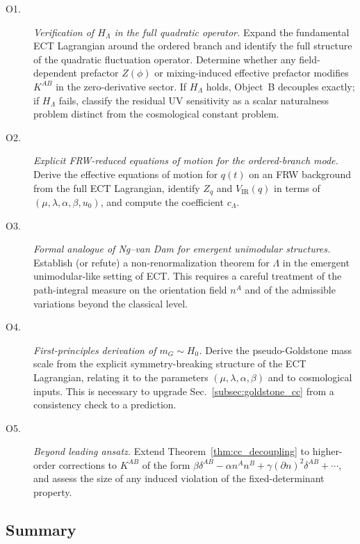 \begin{description}
\item[O1.] \textit{Verification of $H_\Lambda$ in the full quadratic operator.}
Expand the fundamental ECT Lagrangian around the ordered branch and
identify the full structure of the quadratic fluctuation operator.
Determine whether any field-dependent prefactor $Z(\phi)$ or
mixing-induced effective prefactor modifies $K^{AB}$ in the
zero-derivative sector. If $H_\Lambda$ holds, Object~B decouples exactly; if
$H_\Lambda$ fails, classify the residual UV sensitivity as a scalar
naturalness problem distinct from the cosmological constant problem.

\item[O2.] \textit{Explicit FRW-reduced equations of motion for the
ordered-branch mode.} Derive the effective equations of motion for
$q(t)$ on an FRW background from the full ECT Lagrangian, identify
$Z_q$ and $V_{\mathrm{IR}}(q)$ in terms of
$(\mu,\lambda,\alpha,\beta,u_0)$, and compute the coefficient
$c_\Lambda$.

\item[O3.] \textit{Formal analogue of Ng--van Dam for emergent
unimodular structures.} Establish (or refute) a non-renormalization
theorem for $\Lambda$ in the emergent unimodular-like setting of ECT.
This requires a careful treatment of the path-integral measure on the
orientation field $n^A$ and of the admissible variations beyond the
classical level.
\item[O4.] \textit{First-principles derivation of $m_G \sim H_0$.}
Derive the pseudo-Goldstone mass scale from the explicit
symmetry-breaking structure of the ECT Lagrangian, relating it to
the parameters $(\mu,\lambda,\alpha,\beta)$ and to cosmological
inputs. This is necessary to upgrade Sec.~\ref{subsec:goldstone_cc}
from a consistency check to a prediction.

\item[O5.] \textit{Beyond leading ansatz.} Extend Theorem~\ref{thm:cc_decoupling} to
higher-order corrections to $K^{AB}$ of the form
$\beta\delta^{AB} - \alpha n^A n^B + \gamma(\partial n)^2 \delta^{AB}
+ \cdots$, and assess the size of any induced violation of the
fixed-determinant property.
\end{description}


\subsection{Summary}
\label{subsec:cc_summary}

